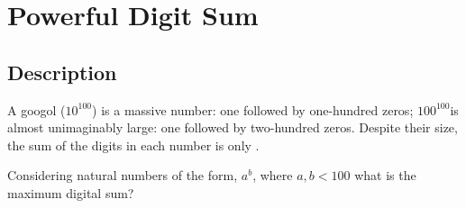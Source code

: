 \section{Powerful Digit Sum}
\subsection{Description}
A googol (\( 10^{100} \)) is a massive number: one followed by one-hundred zeros;
\( 100^{100} \)is almost unimaginably large: one followed by two-hundred zeros. Despite their size, the sum of the digits in
each number is only .

Considering natural numbers of the form, \( a^b \), where \( a, b < 100 \) what is the maximum digital sum?
